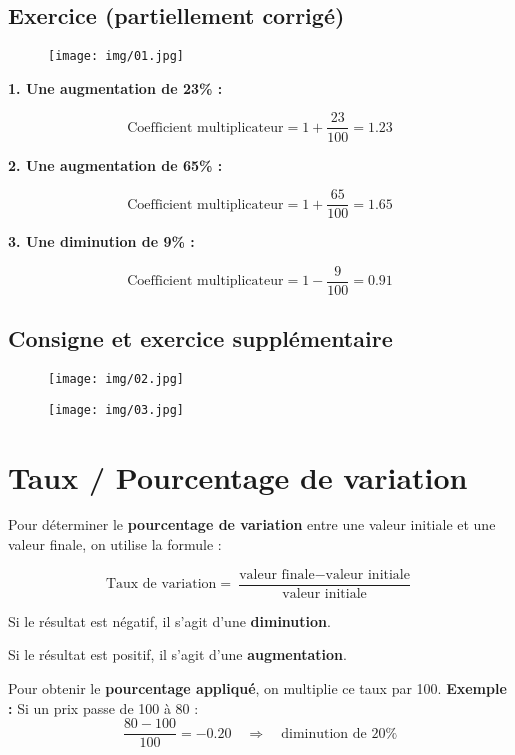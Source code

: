 \documentclass[a4paper,12pt]{article}
\begin{document}
\subsection*{Exercice (partiellement corrigé)}

    \begin{figure}[H]
        \centering
        \texttt{[image: img/01.jpg]}
      \end{figure}


\textbf{1. Une augmentation de 23\% :}

\[
\text{Coefficient multiplicateur} = 1 + \frac{23}{100} = 1.23
\]

\textbf{2. Une augmentation de 65\% :}

\[
\text{Coefficient multiplicateur} = 1 + \frac{65}{100} = 1.65
\]

\textbf{3. Une diminution de 9\% :}

\[
\text{Coefficient multiplicateur} = 1 - \frac{9}{100} = 0.91
\]


\subsection*{Consigne et exercice supplémentaire}

\begin{figure}[H]
    \centering
    \texttt{[image: img/02.jpg]}
  \end{figure}

  \begin{figure}[H]
    \centering
    \texttt{[image: img/03.jpg]}
  \end{figure}

  \section*{Taux / Pourcentage de variation}

  \begin{tcolorbox}[colback=blue!5!white, colframe=blue!75!black, title=Méthode]
    Pour déterminer le \textbf{pourcentage de variation} entre une valeur initiale et une valeur finale, on utilise la formule :
    
    \[
    \text{Taux de variation} = \frac{\text{valeur finale} - \text{valeur initiale}}{\text{valeur initiale}}
    \]
    \vspace{1em}
    \begin{compactitem}
        \item Si le résultat est négatif, il s'agit d'une \textbf{diminution}.
        \item Si le résultat est positif, il s'agit d'une \textbf{augmentation}.
    \end{compactitem}
    \vspace{1em}
    Pour obtenir le \textbf{pourcentage appliqué}, on multiplie ce taux par 100. \textbf{Exemple :} Si un prix passe de 100 à 80 :
    \[
    \frac{80 - 100}{100} = -0.20 \quad \Rightarrow \quad \text{diminution de } 20\%
    \]
    \end{tcolorbox}
\end{document}
